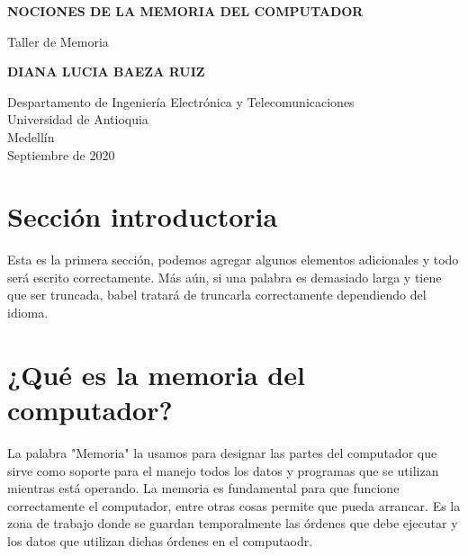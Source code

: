 \documentclass{article}
\begin{document}
\begin{titlepage}
    \begin{center}
        \vspace*{1cm}
            
        \Huge
        \textbf{NOCIONES DE LA MEMORIA DEL COMPUTADOR}
            
        \vspace{0.5cm}
        \LARGE
        Taller de Memoria
            
        \vspace{1.5cm}
            
        \textbf{DIANA LUCIA BAEZA RUIZ}
            
        \vfill
            
        \vspace{0.8cm}
            
        \Large
        Despartamento de Ingeniería Electrónica y Telecomunicaciones\\
        Universidad de Antioquia\\
        Medellín\\
        Septiembre de 2020
            
    \end{center}
\end{titlepage}

\tableofcontents

\section{Sección introductoria}
Esta es la primera sección, podemos agregar algunos elementos adicionales y todo será escrito correctamente. Más aún, si una palabra es demasiado larga y tiene que ser truncada, babel tratará de truncarla correctamente dependiendo del idioma.

\section{¿Qué es la memoria del computador?} \label{contenido}

La palabra "Memoria" la usamos para designar las partes del computador que sirve como soporte para el manejo todos los datos y programas que se utilizan mientras está operando. La memoria es fundamental para que funcione correctamente el computador, entre otras cosas permite que pueda arrancar.
Es la zona de trabajo donde se guardan temporalmente las órdenes que debe ejecutar y los datos que utilizan dichas órdenes en el computaodr.\cite{dirac}
\end{document}
